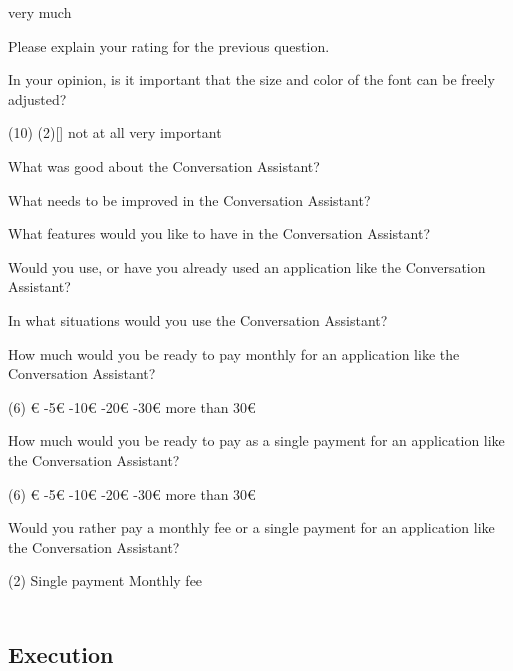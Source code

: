 \documentclass[english, 12pt, a4paper, pdftex, elec, utf8]{aaltothesis}
\begin{document}
{\begin{questionnaire}[resume]
\begin{tasks}[]
			\task[] very much
		\end{tasks}
		\item Please explain your rating for the previous question.
		\item In your opinion, is it important that the size and color of the font can be freely adjusted?
		\begin{tasks}[](10)
			\task*(2)[] not at all
			\task[] very important
		\end{tasks}
		\item What was good about the Conversation Assistant?
		\item What needs to be improved in the Conversation Assistant?
		\item What features would you like to have in the Conversation Assistant?
		\item Would you use, or have you already used an application like the Conversation Assistant?
		\item In what situations would you use the Conversation Assistant?
		\item How much would you be ready to pay monthly for an application like the Conversation Assistant?
		\begin{tasks}[label-width = 2em](6)
			€
			-5€
			-10€
			-20€
			-30€
			\task more than 30€
		\end{tasks}
		\item How much would you be ready to pay as a single payment for an application like the Conversation Assistant?
		\begin{tasks}[label-width = 2em](6)
			\task 0€
			\task 1-5€
			\task 5-10€
			\task 10-20€
			\task 20-30€
			\task more than 30€
		\end{tasks}
		\item Would you rather pay a monthly fee or a single payment for an application like the Conversation Assistant?
		\begin{tasks}[label-width = 2em](2)
			\task Single payment
			\task Monthly fee \\\\
		\end{tasks}
	\end{questionnaire}
}

\clearpage

\subsection{Execution} \label{sec:execution}
\end{document}
